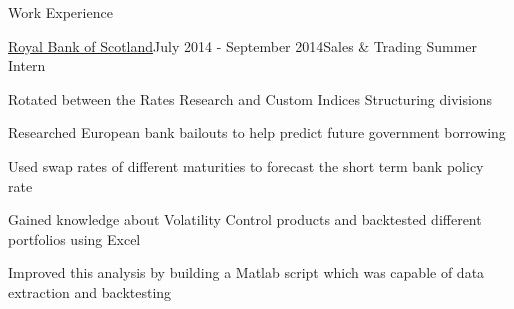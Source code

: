 \documentclass{resume} %
\begin{document}
\begin{rSection}{Work Experience}
\begin{rSubsection}{\href{https://www.natwestmarkets.com/}{Royal Bank of Scotland}}{July 2014 - September 2014}{Sales \& Trading Summer Intern}{}
\item Rotated between the Rates Research and Custom Indices Structuring divisions
\item Researched European bank bailouts to help predict future government borrowing
\item Used swap rates of different maturities to forecast the short term bank policy rate
\item Gained knowledge about Volatility Control products and backtested different portfolios using Excel
\item Improved this analysis by building a Matlab script which was capable of data extraction and backtesting
\end{rSubsection}
\fi

\iffalse
\begin{rSubsection}{Tao Applications}{June 2013 - Current}{Android Application Developer}{}
\item Worked with a partner on developing applications such as a poker and speedometer
\item Widened my understanding about programming 
\end{rSubsection}

\fi

\iffalse
\begin{rSubsection}{British Army}{October 2012 - February 2013}{Officer Cadet}{}
\item Trained to become an officer in the army through field craft and battle drills
\item Enhanced my leadership and teamwork skills through missions and tasks
\end{rSubsection}
\fi
\iffalse
\begin{rSubsection}{West Lea School, UK}{September 2009 - February 2010}{Teaching Assistant}{}
\item Developed communication skills through explaining new concepts to the students
\item Increased my confidence by presenting to a classroom sized audience
\end{rSubsection}


\begin{rSubsection}{Somar \& Co Ltd}{June 2009}{Office Administrator/Accounts}{}
\item Gained experience working in the financial sector and learnt about financial reporting
\item Assisted in preparation of balance sheets for different companies using Excel
\end{rSubsection}
\fi
\end{rSection}
\end{document}
